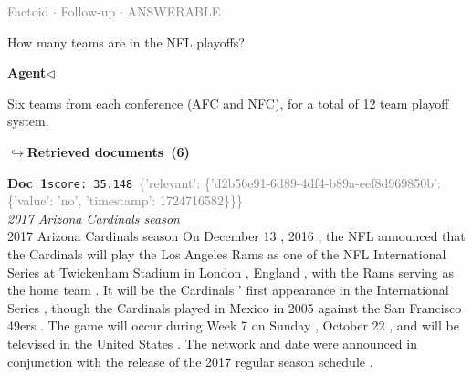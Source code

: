 \documentclass[a4paper,11pt]{article}
\begin{document}
\vspace{0.5em}
\hfill{\tiny\textcolor{gray}{Factoid $\cdot$ Follow-up $\cdot$ ANSWERABLE}}
\begin{userbubble}
How many teams are in the NFL playoffs?
\end{userbubble}
\noindent\hfill{\small\textcolor{agentcolor}{\textbf{Agent\enspace$\triangleleft$}}}
\begin{agentbubble}
Six teams from each conference (AFC and NFC), for a total of 12 team playoff system.
\end{agentbubble}
\noindent\hfill{\footnotesize\textcolor{doccolor}{\textbf{$\hookrightarrow$\enspace Retrieved documents~(6)}}}
\begin{docenv}
{\footnotesize\textcolor{doccolor}{\textbf{Doc~1}}}\hfill{\tiny\texttt{score:~35.148}}\ {\tiny\textcolor{gray}{\{'relevant': \{'d2b56e91-6d89-4df4-b89a-eef8d969850b': \{'value': 'no', 'timestamp': 1724716582\}\}\}}}\\[3pt]
{\small\textit{2017 Arizona Cardinals season}}\\[2pt]
\vspace{2pt}
{\footnotesize 2017 Arizona Cardinals season
On December 13 , 2016 , the NFL announced that the Cardinals will play the Los Angeles Rams as one of the NFL International Series at Twickenham Stadium in London , England , with the Rams serving as the home team . It will be the Cardinals ' first appearance in the International Series , though the Cardinals played in Mexico in 2005 against the San Francisco 49ers . The game will occur during Week 7 on Sunday , October 22 , and will be televised in the United States . The network and date were announced in conjunction with the release of the 2017 regular season schedule .}
\end{docenv}
\end{document}
